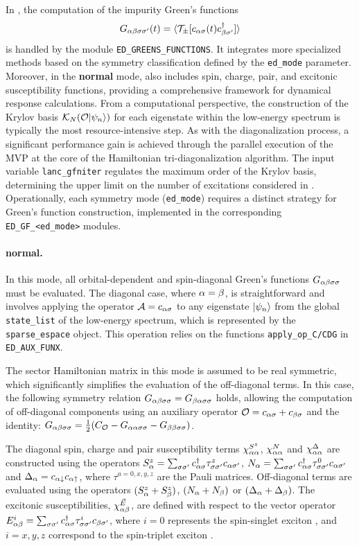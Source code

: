 \documentclass[edipack_sp.tex]{subfiles}
\begin{document}
In \NAME, the computation of the impurity Green's functions 
$$
G_{\alpha\beta\sigma\sigma'}(t)=\langle {\cal T}_\pm[ c_{\alpha\sigma}(t) c_{\beta\sigma'}^\dagger ]\rangle
$$
is handled by the module \texttt{ED\_GREENS\_FUNCTIONS}.
It integrates more specialized methods based on the symmetry
classification defined by the \texttt{ed\_mode} parameter.
Moreover, in the {\bf normal} mode, \NAME also includes spin, charge, pair, and excitonic susceptibility functions, providing a comprehensive framework for dynamical response calculations.
From a computational perspective, the construction of the Krylov basis
$\mathcal{K}_N({\cal O}|\psi_n\rangle)$ for each eigenstate within the low-energy
spectrum is typically the most resource-intensive step.
As with the
diagonalization process, a significant performance gain is achieved through
the parallel execution of the MVP at the core of
the Hamiltonian tri-diagonalization algorithm.
The input variable
\texttt{lanc\_gfniter} regulates the maximum order of the Krylov basis,
determining the upper limit on the number of excitations considered in
.
Operationally, each symmetry mode (\texttt{ed\_mode}) requires a distinct
strategy for Green's function construction, implemented in the corresponding
\texttt{ED\_GF\_<ed\_mode>} modules.


\paragraph{{\bf normal}.}
In this mode, all orbital-dependent and spin-diagonal Green's 
functions $G_{\alpha\beta\sigma\sigma}$ must be evaluated. The diagonal 
case, where $\alpha=\beta$, is straightforward and involves applying 
the operator ${\cal A}=c_{\alpha\sigma}$ to any eigenstate $|\psi_n\rangle$ 
from the global {\tt state\_list} of the low-energy spectrum, 
which is represented by the {\tt sparse\_espace} object. This 
operation relies on the functions {\tt apply\_op\_C/CDG} in 
{\tt ED\_AUX\_FUNX}. 



The sector Hamiltonian matrix in this mode is assumed 
to be real symmetric, which significantly simplifies the evaluation of the off-diagonal terms. In this case, the following symmetry relation 
$G_{\alpha\beta\sigma\sigma}=G_{\beta\alpha\sigma\sigma}$ holds, allowing the computation of 
off-diagonal components using an auxiliary operator 
${\cal O}=c_{\alpha\sigma}+c_{\beta\sigma}$ and the identity:
$G_{\alpha\beta\sigma\sigma}=\tfrac{1}{2}(C_{\cal O} - G_{\alpha\alpha\sigma\sigma} - G_{\beta\beta\sigma\sigma})$.

The diagonal spin, charge and pair susceptibility terms
$\chi^{S^z}_{\alpha\alpha}$, $\chi^N_{\alpha\alpha}$ and $\chi^\Delta_{\alpha\alpha}$
are constructed using the operators $S^z_\alpha = \sum_{\sigma\sigma'} c^\dagger_{\alpha\sigma}
\tau^z_{\sigma\sigma'} c_{\alpha\sigma'}$, 
$N_\alpha = \sum_{\sigma\sigma'} c^\dagger_{\alpha\sigma} \tau^0_{\sigma\sigma'} c_{\alpha\sigma'}$
and $\Delta_\alpha = c_{\alpha\downarrow}c_{\alpha\uparrow}$,
where $\tau^{a=0,x,y,z}$ are the Pauli matrices.
Off-diagonal terms are  evaluated using the operators
$(S^z_\alpha + S^z_\beta)$, $(N_\alpha + N_\beta)$ or $(\Delta_\alpha + \Delta_\beta)$. 
The excitonic susceptibilities, $\chi^{\vec{E}}_{\alpha\beta}$, are defined with 
respect to the vector operator $E^i_{\alpha\beta} = \sum_{\sigma\sigma'}
c^\dagger_{\alpha\sigma}\tau^i_{\sigma\sigma'}c_{\beta\sigma'}$, where $i=0$ represents the
spin-singlet exciton \cite{Giuli2023PRB}, and $i=x,y,z$  correspond to the spin-triplet exciton \cite{Amaricci2023_excitons}.
\end{document}
